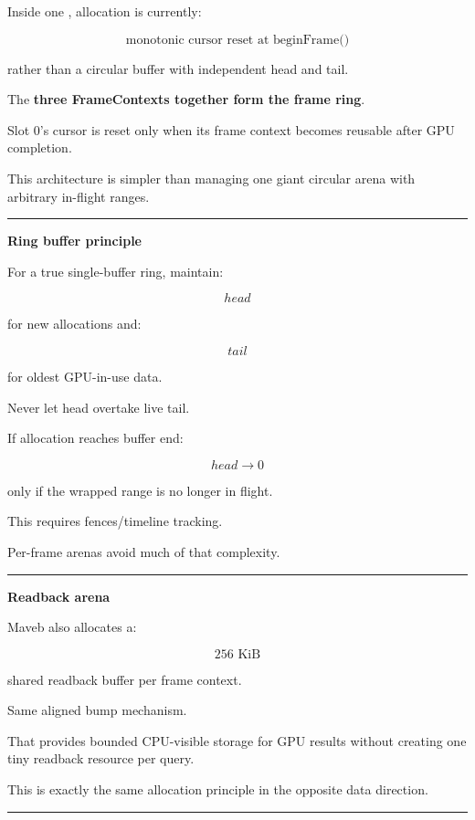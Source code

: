 Inside one , allocation is currently:

\[
\boxed{
\text{monotonic cursor reset at beginFrame()}
}
\]

rather than a circular buffer with independent head and tail.

The \textbf{three FrameContexts together form the frame ring}.

Slot 0's cursor is reset only when its frame context becomes reusable after GPU completion.

This architecture is simpler than managing one giant circular arena with arbitrary in-flight ranges.

\begin{center}\rule{0.5\linewidth}{0.5pt}\end{center}

\textbf{Ring buffer principle}

For a true single-buffer ring, maintain:

\[
head
\]

for new allocations and:

\[
tail
\]

for oldest GPU-in-use data.

Never let head overtake live tail.

If allocation reaches buffer end:

\[
head\rightarrow0
\]

only if the wrapped range is no longer in flight.

This requires fences/timeline tracking.

Per-frame arenas avoid much of that complexity.

\begin{center}\rule{0.5\linewidth}{0.5pt}\end{center}

\textbf{Readback arena}

Maveb also allocates a:

\[
256\text{ KiB}
\]

shared readback buffer per frame context.

Same aligned bump mechanism.

That provides bounded CPU-visible storage for GPU results without creating one tiny readback resource per query.

This is exactly the same allocation principle in the opposite data direction.

\begin{center}\rule{0.5\linewidth}{0.5pt}\end{center}

